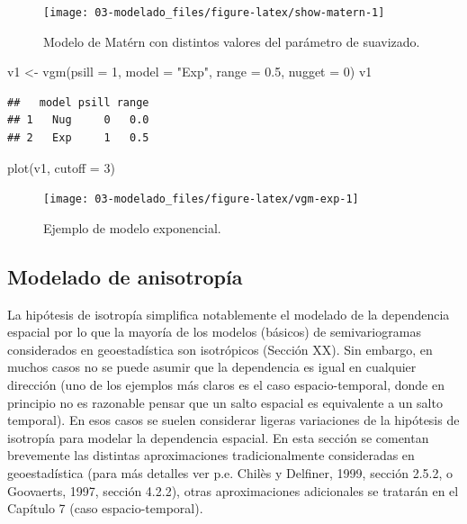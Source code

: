 \documentclass[
  spanish,
]{book}
\newenvironment{Shaded}{\begin{snugshade}}{\end{snugshade}}
\newcommand{\AttributeTok}[1]{\textcolor[rgb]{0.77,0.63,0.00}{#1}}
\newcommand{\DecValTok}[1]{\textcolor[rgb]{0.00,0.00,0.81}{#1}}
\newcommand{\FloatTok}[1]{\textcolor[rgb]{0.00,0.00,0.81}{#1}}
\newcommand{\FunctionTok}[1]{\textcolor[rgb]{0.00,0.00,0.00}{#1}}
\newcommand{\NormalTok}[1]{#1}
\newcommand{\OtherTok}[1]{\textcolor[rgb]{0.56,0.35,0.01}{#1}}
\newcommand{\StringTok}[1]{\textcolor[rgb]{0.31,0.60,0.02}{#1}}
\theoremstyle{break}
\begin{document}
\begin{figure}[!htb]

{\centering \texttt{[image: 03-modelado\_files/figure-latex/show-matern-1]} 

}

\caption{Modelo de Matérn con distintos valores del parámetro de suavizado.}\label{fig:show-matern}
\end{figure}

\begin{Shaded}
\begin{Highlighting}[]
\NormalTok{v1 }\OtherTok{\textless{}{-}} \FunctionTok{vgm}\NormalTok{(}\AttributeTok{psill =} \DecValTok{1}\NormalTok{, }\AttributeTok{model =} \StringTok{"Exp"}\NormalTok{, }\AttributeTok{range =} \FloatTok{0.5}\NormalTok{, }\AttributeTok{nugget =} \DecValTok{0}\NormalTok{)}
\NormalTok{v1}
\end{Highlighting}
\end{Shaded}

\begin{verbatim}
##   model psill range
## 1   Nug     0   0.0
## 2   Exp     1   0.5
\end{verbatim}

\begin{Shaded}
\begin{Highlighting}[]
\FunctionTok{plot}\NormalTok{(v1, }\AttributeTok{cutoff =} \DecValTok{3}\NormalTok{)}
\end{Highlighting}
\end{Shaded}

\begin{figure}[!htb]

{\centering \texttt{[image: 03-modelado\_files/figure-latex/vgm-exp-1]} 

}

\caption{Ejemplo de modelo exponencial.}\label{fig:vgm-exp}
\end{figure}

\hypertarget{anisotropia}{%
\subsection{Modelado de anisotropía}\label{anisotropia}}

La hipótesis de isotropía simplifica notablemente el modelado de la dependencia espacial por lo que la mayoría de los modelos (básicos) de semivariogramas considerados en geoestadística son isotrópicos (Sección XX).
Sin embargo, en muchos casos no se puede asumir que la dependencia es igual en cualquier dirección (uno de los ejemplos más claros es el caso espacio-temporal, donde en principio no es razonable pensar que un salto espacial es equivalente a un salto temporal).
En esos casos se suelen considerar ligeras variaciones de la hipótesis de isotropía para modelar la dependencia espacial.
En esta sección se comentan brevemente las distintas aproximaciones tradicionalmente consideradas en geoestadística (para más detalles ver p.e. Chilès y Delfiner, 1999, sección 2.5.2, o Goovaerts, 1997, sección 4.2.2), otras aproximaciones adicionales se tratarán en el Capítulo 7 (caso espacio-temporal).
\end{document}
